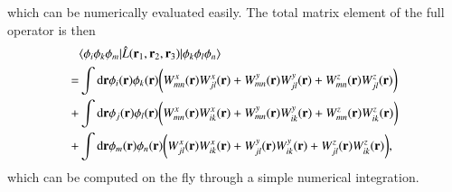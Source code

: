 \documentclass[aip,jcp,reprint,noshowkeys,superscriptaddress]{revtex4-1}
\newcommand{\matelem}[3]{\langle #1 | #2 | #3 \rangle}
\newcommand{\bri}[1]{{\bf r}_{#1}}
\begin{document}
which can be numerically evaluated easily. 
The total matrix element of the full operator is then 
\begin{equation}
 \label{eq:l_ijmkln_final}
 \begin{aligned}
 & \matelem{\phi_i \phi_k \phi_m}{\hat{L}(\bri{1},\bri{2},\bri{3})}{\phi_k \phi_l \phi_n} \\
 = & \int \text{d}{\bf r} \phi_i({\bf r})  \phi_k({\bf r}) \bigg( W_{mn}^x({\bf r}) W_{jl}^x({\bf r}) + W_{mn}^y({\bf r}) W_{jl}^y({\bf r}) + W_{mn}^z({\bf r}) W_{jl}^z({\bf r})\bigg) \\
 + & \int \text{d}{\bf r}\phi_j({\bf r})  \phi_l({\bf r}) \bigg( W_{mn}^x({\bf r}) W_{ik}^x({\bf r}) + W_{mn}^y({\bf r}) W_{ik}^y({\bf r}) + W_{mn}^z({\bf r}) W_{ik}^z({\bf r})\bigg) \\
 + & \int \text{d}{\bf r} \phi_m({\bf r})  \phi_n({\bf r}) \bigg( W_{jl}^x({\bf r}) W_{ik}^x({\bf r}) + W_{jl}^y({\bf r}) W_{ik}^y({\bf r}) + W_{jl}^z({\bf r}) W_{ik}^z({\bf r})\bigg), 
 \end{aligned}
\end{equation}
which can be computed on the fly through a simple numerical integration. 
\end{document}
